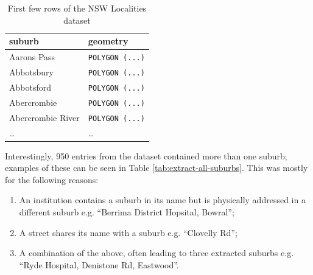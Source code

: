 \begin{table}[htbp]
\centering
\caption{First few rows of the NSW Localities dataset}
\label{tab:suburb-dataset-head}
\begin{tabular}{@{}ll@{}}
\toprule
\textbf{suburb}      & \textbf{geometry}      \\ \midrule
Aarons Pass & \texttt{POLYGON (...)} \\
Abbotsbury  & \texttt{POLYGON (...)} \\
Abbotsford  & \texttt{POLYGON (...)} \\
Abercrombie & \texttt{POLYGON (...)} \\ 
Abercrombie River & \texttt{POLYGON (...)} \\
\ldots & \ldots \\ \bottomrule
\end{tabular}
\end{table}

Interestingly, 950 entries from the dataset contained more than one suburb; examples of these can be seen in Table \ref{tab:extract-all-suburbs}. This was mostly for the following reasons:
\begin{enumerate}
    \item An institution contains a suburb in its name but is physically addressed in a different suburb e.g. ``Berrima District Hopsital, Bowral'';
    \item A street shares its name with a suburb e.g. ``Clovelly Rd'';
    \item A combination of the above, often leading to three extracted suburbs e.g. ``Ryde Hospital, Denistone Rd, Eastwood''.
\end{enumerate}

\begin{table}[htbp]
\centering
\caption{A select few examples of place of death entries containing multiple suburbs}
\label{tab:extract-all-suburbs}
\end{table}

